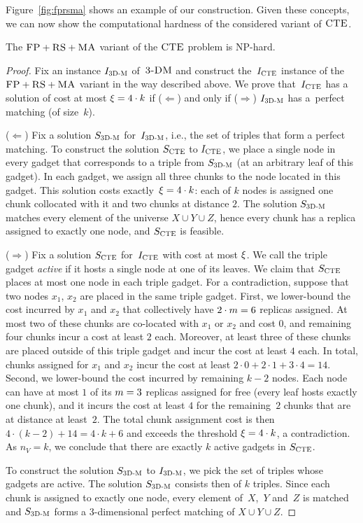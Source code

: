 Figure~\ref{fig:fprsma} shows an example of our construction.
Given these concepts, we can now show the computational hardness of the considered variant of $\textsc{CTE}$.
\begin{theorem}
  The $\textsc{FP}+\textsc{RS}+\textsc{MA}$ variant of the $\textsc{CTE}$ problem is NP-hard.
  \label{th:ma-unlimited}
\end{theorem}
\begin{proof}
Fix an instance $I_{\mathrm{\textsc{3D-M}}}$ of~$\textsc{3-DM}$ and construct the~$I_{\mathrm{\textsc{CTE}}}$ instance of
the~$\textsc{FP}+\textsc{RS}+\textsc{MA}$ variant in the way described above. We prove that~$I_{\mathrm{\textsc{CTE}}}$ has a solution of cost at most $\xi = 4 \cdot k$ if ($\Leftarrow$) and only if
($\Rightarrow$)
$I_{\mathrm{\textsc{3D-M}}}$ has a~perfect matching (of size~$k$).

\medskip

($\Leftarrow$) Fix a solution $S_{\mathrm{\textsc{3D-M}}}$ for~$I_{\mathrm{\textsc{3D-M}}}$, i.e., the set of triples that form a perfect matching. To construct the solution $S_{\mathrm{\textsc{CTE}}}$ to $I_{\mathrm{\textsc{CTE}}}$, we place a single node in every
gadget that corresponds to a triple from $S_{\mathrm{\textsc{3D-M}}}$ (at an arbitrary leaf of this gadget). In each gadget, we assign all three chunks to the node located in this gadget. This
solution costs exactly~$\xi = 4\cdot k$: each of $k$ nodes is assigned one chunk collocated with it and two chunks at distance $2$.
The solution $S_{\mathrm{\textsc{3D-M}}}$ matches every element of the universe $X \cup Y \cup Z$, hence every chunk has a replica assigned to exactly one node, and $S_{\mathrm{\textsc{CTE}}}$ is feasible.

\medskip

($\Rightarrow$) Fix a solution $S_{\mathrm{\textsc{CTE}}}$ for~$I_{\mathrm{\textsc{CTE}}}$ with cost at most $\xi$.
We call the triple gadget \emph{active} if it hosts a single node at one of its leaves.
We claim that $S_{\mathrm{\textsc{CTE}}}$ places at most one node in each triple gadget.
For a contradiction, suppose that two nodes $x_1$, $x_2$ are placed in the same triple gadget.
First, we lower-bound the cost incurred by $x_1$ and $x_2$ that collectively have $2\cdot m = 6$ replicas assigned.
At most two of these chunks are co-located with $x_1$ or $x_2$ and cost $0$, and remaining four chunks incur a cost at least $2$ each.
Moreover, at least three of these chunks are placed outside of this triple gadget and incur the cost at least $4$ each.
In total, chunks assigned for $x_1$ and $x_2$ incur the cost at least $2\cdot 0+2\cdot 1+3\cdot 4=14$.
Second, we lower-bound the cost incurred by remaining $k-2$ nodes.
Each node can have at most $1$ of its $m=3$ replicas assigned for free (every leaf hosts exactly one chunk),
and it incurs the cost at least $4$ for the remaining~$2$ chunks that are at distance at least~$2$.
The total chunk assignment cost is then $4\cdot (k-2)+14 = 4\cdot k + 6$ and exceeds the threshold $\xi = 4\cdot k$, a contradiction.
As $n_V = k$, we conclude that there are exactly $k$ active gadgets in $S_{\mathrm{\textsc{CTE}}}$.

To construct the solution $S_{\mathrm{\textsc{3D-M}}}$ to $I_{\mathrm{\textsc{3D-M}}}$, we pick the set of triples whose gadgets are active.
The solution $S_{\mathrm{\textsc{3D-M}}}$ consists then of $k$ triples.
Since each chunk is assigned to exactly one node, every element of~$X$,~$Y$ and~$Z$ is matched and $S_{\mathrm{\textsc{3D-M}}}$ forms a 3-dimensional perfect matching of $X \cup Y\cup Z$.
\end{proof}

